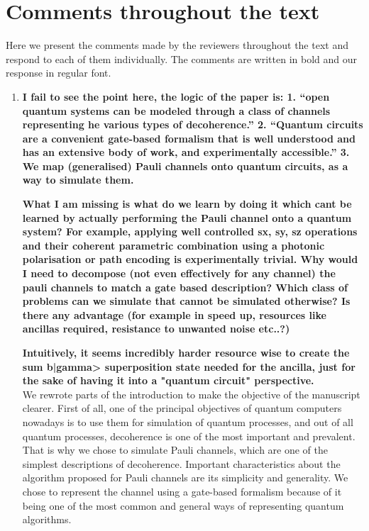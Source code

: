 \documentclass[10pt,letterpaper]{article} %
\begin{document}
\section*{Comments throughout the text} %

Here we present the comments made by the reviewers throughout the text 
and respond to each of them individually.
The comments are written in bold and our response in regular font.

\begin{enumerate}
\item \textbf{I fail to see the point here, the logic of the paper is: 
1. ``open quantum systems can be modeled through a class of channels representing he various types of decoherence.'' 2. ``Quantum circuits are a convenient gate-based formalism that is well understood and has an extensive body of work, and experimentally accessible.''
3. We map (generalised) Pauli channels onto quantum circuits, as a way to simulate them.} 

\textbf{What I am missing is what do we learn by doing it which cant be learned by actually performing the Pauli channel onto a quantum system? For example, applying well controlled sx, sy, sz operations and their coherent parametric combination using a photonic polarisation or path encoding is experimentally trivial. Why would I need to decompose (not even effectively for any channel) the pauli channels to match a gate based description? Which class of problems can we simulate that cannot be simulated otherwise? Is there any advantage (for example in speed up, resources like ancillas required, resistance to unwanted noise etc..?)}

\textbf{Intuitively, it seems incredibly harder resource wise to create the sum b|gamma> superposition state needed for the ancilla, just for the sake of having it into a "quantum circuit" perspective. }\\


We rewrote parts of the introduction to make the objective of the manuscript clearer. 
First of all, one of the principal objectives of quantum computers nowadays
is to use them for simulation of quantum processes,
and out of all quantum processes, decoherence is one of the most important and prevalent.
That is why we chose to simulate Pauli channels, which are one of the
simplest descriptions of decoherence. 
Important characteristics about the algorithm proposed for Pauli channels
are its simplicity and generality.
We chose to represent the channel using a gate-based formalism because
of it being one of the most common and general ways of
representing quantum algorithms.


\end{enumerate}
\end{document}
